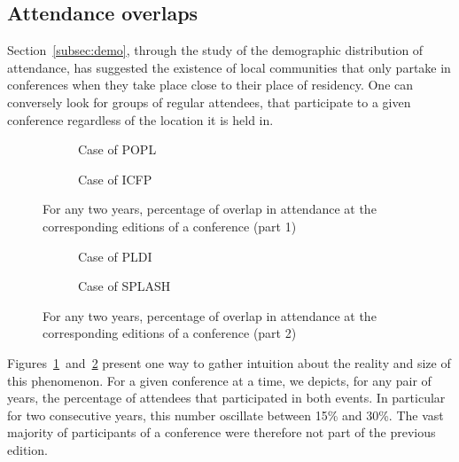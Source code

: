 \documentclass{scrartcl}
\newcommand{\conf}{conference}
\begin{document}
\subsection{Attendance overlaps}
\label{subsec:overlap}

Section~\ref{subsec:demo}, through the study of the demographic distribution of
attendance, has suggested the existence of local communities that only
partake in conferences when they take place close to their place of residency.
One can conversely look for groups of regular attendees, that participate to a given \conf
regardless of the location it is held in.

\begin{figure}
\centering
     \begin{subfigure}[b]{0.4\textwidth}
       \centering
       \caption{Case of POPL}
     \end{subfigure}
     \hfill
     \begin{subfigure}[b]{0.4\textwidth}
       \centering
       \caption{Case of ICFP}
    \end{subfigure}

     \caption{For any two years, percentage of overlap in attendance at the corresponding editions of a conference (part 1)}
     \label{fig:overlap-conf-alpha}
\end{figure}

\begin{figure}
\centering
     \begin{subfigure}[b]{0.4\textwidth}
       \centering
       \caption{Case of PLDI}
     \end{subfigure}
     \begin{subfigure}[b]{0.4\textwidth}
       \centering
       \caption{Case of SPLASH}
     \end{subfigure}

     \caption{For any two years, percentage of overlap in attendance at the corresponding editions of a conference (part 2)}
     \label{fig:overlap-conf-beta}
\end{figure}

Figures~\ref{fig:overlap-conf-alpha}~and~\ref{fig:overlap-conf-beta} present one
way to gather intuition about the reality and size of this phenomenon. For a
given conference at a time, we depicts, for any pair of years, the percentage of
attendees that participated in both events. In particular for two consecutive
years, this number oscillate between 15\% and 30\%. The vast majority of
participants of a conference were therefore not part of the previous edition.
\end{document}
